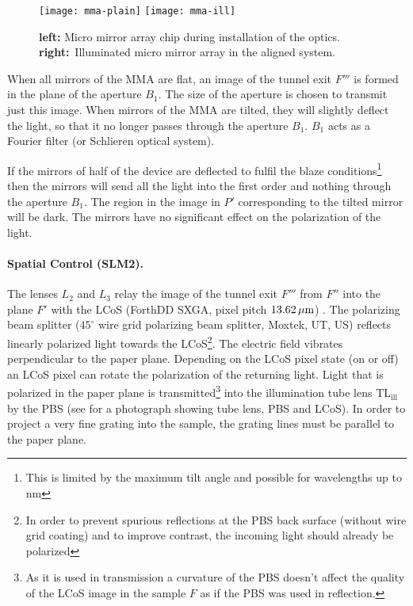 
\begin{figure}[!hbt]
  \centering
  \texttt{[image: mma-plain]}
  \texttt{[image: mma-ill]}
  \caption{{\bf left:} Micro mirror array chip during installation of
    the optics. {\bf right:}~Illuminated micro mirror array in the
    aligned system.}
  \label{fig:mma-closeup}
\end{figure}

When all mirrors of the MMA are flat, an image of the tunnel exit $F'''$
is formed in the plane of the aperture $B_1$. The size of the aperture
is chosen to transmit just this image. When mirrors of the MMA are
tilted, they will slightly deflect the light, so that it no longer
passes through the aperture $B_1$. $B_1$ acts as a Fourier filter (or
Schlieren optical system).

If the mirrors of half of the device are deflected to fulfil the blaze
conditions\footnote{This is limited by the maximum tilt angle and
  possible for wavelengths up to \unit[1000]{nm}} then the mirrors
will send all the light into the first order and nothing through the
aperture $B_1$.  The region in the image in $P'$ corresponding to the
tilted mirror will be dark. The mirrors have no significant effect on
the polarization of the light.

\paragraph{Spatial Control (SLM2).}
The lenses $L_2$ and $L_3$ relay the image of the tunnel exit $F'''$
from $F''$ into the plane $F'$ with the LCoS (ForthDD SXGA, pixel
pitch $\unit[13.62]{\mu m}$) \citep{Cartwright2007}. The polarizing
beam splitter ($45^\circ$ wire grid polarizing beam splitter, Moxtek,
UT, US) reflects linearly polarized light towards the LCoS\footnote{In
  order to prevent spurious reflections at the PBS back surface
  (without wire grid coating) and to improve contrast, the incoming
  light should already be polarized}. The electric field vibrates
perpendicular to the paper plane. Depending on the LCoS pixel state
(on or off) an LCoS pixel can rotate the polarization of the returning
light. Light that is polarized in the paper plane is
transmitted\footnote{As it is used in transmission a curvature of the
  PBS doesn't affect the quality of the LCoS image in the sample $F$
  as if the PBS was used in reflection.}  into the illumination tube
lens $\textrm{TL}_\textrm{ill}$ by the PBS (see  for
a photograph showing tube lens, PBS and LCoS). In order to project a
very fine grating into the sample, the grating lines must be parallel
to the paper plane.

